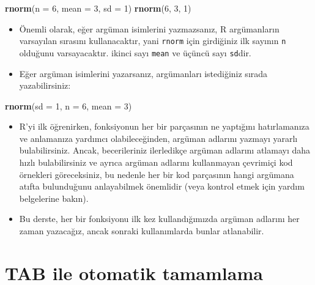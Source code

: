 \documentclass[
  oneside]{book}
\newenvironment{Shaded}{\begin{snugshade}}{\end{snugshade}}
\newcommand{\AttributeTok}[1]{\textcolor[rgb]{0.13,0.29,0.53}{#1}}
\newcommand{\DecValTok}[1]{\textcolor[rgb]{0.00,0.00,0.81}{#1}}
\newcommand{\FunctionTok}[1]{\textcolor[rgb]{0.13,0.29,0.53}{\textbf{#1}}}
\newcommand{\NormalTok}[1]{#1}
\begin{document}
\begin{Shaded}
\begin{Highlighting}[]
\FunctionTok{rnorm}\NormalTok{(}\AttributeTok{n =} \DecValTok{6}\NormalTok{, }\AttributeTok{mean =} \DecValTok{3}\NormalTok{, }\AttributeTok{sd =} \DecValTok{1}\NormalTok{)}
\FunctionTok{rnorm}\NormalTok{(}\DecValTok{6}\NormalTok{, }\DecValTok{3}\NormalTok{, }\DecValTok{1}\NormalTok{)}
\end{Highlighting}
\end{Shaded}

\begin{itemize}
\item
  Önemli olarak, eğer argüman isimlerini yazmazsanız, R argümanların varsayılan sırasını kullanacaktır, yani \texttt{rnorm} için girdiğiniz ilk sayının \texttt{n} olduğunu varsayacaktır. ikinci sayı \texttt{mean} ve üçüncü sayı \texttt{sd}dir.
\item
  Eğer argüman isimlerini yazarsanız, argümanları istediğiniz sırada yazabilirsiniz:
\end{itemize}

\begin{Shaded}
\begin{Highlighting}[]
\FunctionTok{rnorm}\NormalTok{(}\AttributeTok{sd =} \DecValTok{1}\NormalTok{, }\AttributeTok{n =} \DecValTok{6}\NormalTok{, }\AttributeTok{mean =} \DecValTok{3}\NormalTok{)}
\end{Highlighting}
\end{Shaded}

\begin{itemize}
\item
  R'yi ilk öğrenirken, fonksiyonun her bir parçasının ne yaptığını hatırlamanıza ve anlamanıza yardımcı olabileceğinden, argüman adlarını yazmayı yararlı bulabilirsiniz. Ancak, becerileriniz ilerledikçe argüman adlarını atlamayı daha hızlı bulabilirsiniz ve ayrıca argüman adlarını kullanmayan çevrimiçi kod örnekleri göreceksiniz, bu nedenle her bir kod parçasının hangi argümana atıfta bulunduğunu anlayabilmek önemlidir (veya kontrol etmek için yardım belgelerine bakın).
\item
  Bu derste, her bir fonksiyonu ilk kez kullandığımızda argüman adlarını her zaman yazacağız, ancak sonraki kullanımlarda bunlar atlanabilir.
\end{itemize}

\hypertarget{tab-ile-otomatik-tamamlama}{%
\section{TAB ile otomatik tamamlama}\label{tab-ile-otomatik-tamamlama}}
\end{document}
